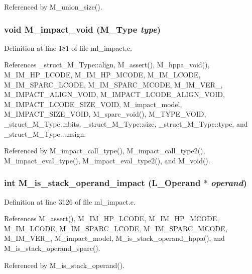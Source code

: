 Referenced by M\_\-union\_\-size().
\subsubsection{\setlength{\rightskip}{0pt plus 5cm}void M\_\-impact\_\-void (\bf{M\_\-Type} {\em type})}\label{ml__impact_8c_c625ece0b7ac684355da7474aa4bfb5f}




Definition at line 181 of file ml\_\-impact.c.

References \_\-struct\_\-M\_\-Type::align, M\_\-assert(), M\_\-hppa\_\-void(), M\_\-IM\_\-HP\_\-LCODE, M\_\-IM\_\-HP\_\-MCODE, M\_\-IM\_\-LCODE, M\_\-IM\_\-SPARC\_\-LCODE, M\_\-IM\_\-SPARC\_\-MCODE, M\_\-IM\_\-VER\_, M\_\-IMPACT\_\-ALIGN\_\-VOID, M\_\-IMPACT\_\-LCODE\_\-ALIGN\_\-VOID, M\_\-IMPACT\_\-LCODE\_\-SIZE\_\-VOID, M\_\-impact\_\-model, M\_\-IMPACT\_\-SIZE\_\-VOID, M\_\-sparc\_\-void(), M\_\-TYPE\_\-VOID, \_\-struct\_\-M\_\-Type::nbits, \_\-struct\_\-M\_\-Type::size, \_\-struct\_\-M\_\-Type::type, and \_\-struct\_\-M\_\-Type::unsign.

Referenced by M\_\-impact\_\-call\_\-type(), M\_\-impact\_\-call\_\-type2(), M\_\-impact\_\-eval\_\-type(), M\_\-impact\_\-eval\_\-type2(), and M\_\-void().
\subsubsection{\setlength{\rightskip}{0pt plus 5cm}int M\_\-is\_\-stack\_\-operand\_\-impact (L\_\-Operand $\ast$ {\em operand})}\label{ml__impact_8c_033087e5c0e736026c15df60df03d092}




Definition at line 3126 of file ml\_\-impact.c.

References M\_\-assert(), M\_\-IM\_\-HP\_\-LCODE, M\_\-IM\_\-HP\_\-MCODE, M\_\-IM\_\-LCODE, M\_\-IM\_\-SPARC\_\-LCODE, M\_\-IM\_\-SPARC\_\-MCODE, M\_\-IM\_\-VER\_, M\_\-impact\_\-model, M\_\-is\_\-stack\_\-operand\_\-hppa(), and M\_\-is\_\-stack\_\-operand\_\-sparc().

Referenced by M\_\-is\_\-stack\_\-operand().
